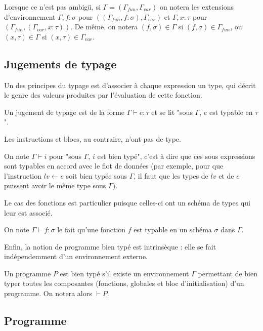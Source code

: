 Lorsque ce n'est pas ambigü, si $Γ=(Γ_{fun},Γ_{var})$ on notera les extensions
d'environnement $Γ,f:σ$ pour $((Γ_{fun},f:σ), Γ_{var})$ et $Γ,x:τ$ pour
$(Γ_{fun},(Γ_{var},x:τ))$. De même, on notera $(f, σ) ∈ Γ$ si $(f, σ) ∈
Γ_{fun}$, ou $(x, τ) ∈ Γ$ si $(x, τ) ∈ Γ_{var}$.

\subsection{Jugements de typage}

Un des principes du typage est d'associer à chaque expression un type, qui
décrit le genre des valeurs produites par l'évaluation de cette fonction.

\begin{definition}
Un jugement de typage est de la forme $Γ ⊢ e : τ$ et se lit "sous $Γ$, $e$ est
typable en $τ$".
\end{definition}

Les instructions et blocs, au contraire, n'ont pas de type.

\begin{definition}
On note $Γ ⊢ i$ pour "sous $Γ$, $i$ est bien typé", c'est à dire que ces sous
expressions sont typables en accord avec le flot de données (par exemple, pour
que l'instruction $lv \leftarrow e$ soit bien typée sous $Γ$, il faut que les
types de $lv$ et de $e$ puissent avoir le même type sous $Γ$).
\end{definition}

Le cas des fonctions est particulier puisque celles-ci ont un schéma de types
qui leur est associé.

\begin{definition}
On note $Γ ⊢ f : σ$ le fait qu'une fonction $f$ est typable en un schéma $σ$ dans $Γ$.
\end{definition}

Enfin, la notion de programme bien typé est intrinsèque : elle se fait
indépendemment d'un environnement externe.

\begin{definition}
Un programme $P$ est bien typé s'il existe un environnement $Γ$ permettant de bien
typer toutes les composantes (fonctions, globales et bloc d'initialisation) d'un
programme. On notera alors $⊢ P$.
\end{definition}

\subsection{Programme}


